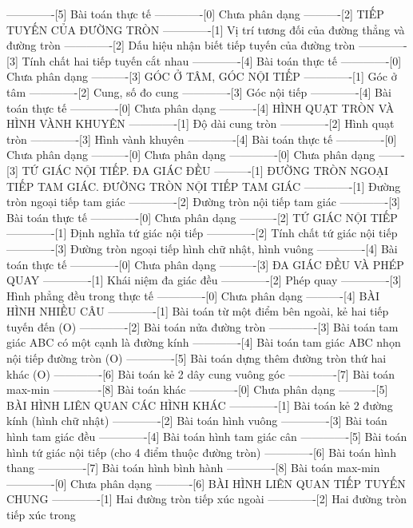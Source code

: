 -------------[5] Bài toán thực tế
-------------[0] Chưa phân dạng
----------[2] TIẾP TUYẾN CỦA ĐƯỜNG TRÒN
-------------[1] Vị trí tương đối của đường thẳng và đường tròn
-------------[2] Dấu hiệu nhận biết tiếp tuyến của đường tròn
-------------[3] Tính chất hai tiếp tuyến cắt nhau
-------------[4] Bài toán thực tế
-------------[0] Chưa phân dạng
----------[3] GÓC Ở TÂM, GÓC NỘI TIẾP
-------------[1] Góc ở tâm
-------------[2] Cung, số đo cung
-------------[3] Góc nội tiếp
-------------[4] Bài toán thực tế
-------------[0] Chưa phân dạng
----------[4] HÌNH QUẠT TRÒN VÀ HÌNH VÀNH KHUYÊN
-------------[1] Độ dài cung tròn
-------------[2] Hình quạt tròn
-------------[3] Hình vành khuyên
-------------[4] Bài toán thực tế
-------------[0] Chưa phân dạng
----------[0] Chưa phân dạng
-------------[0] Chưa phân dạng
-------[3] TỨ GIÁC NỘI TIẾP. ĐA GIÁC ĐỀU
----------[1] ĐƯỜNG TRÒN NGOẠI TIẾP TAM GIÁC. ĐƯỜNG TRÒN NỘI TIẾP TAM GIÁC
-------------[1] Đường tròn ngoại tiếp tam giác
-------------[2] Đường tròn nội tiếp tam giác
-------------[3] Bài toán thực tế
-------------[0] Chưa phân dạng
----------[2] TỨ GIÁC NỘI TIẾP
-------------[1] Định nghĩa tứ giác nội tiếp
-------------[2] Tính chất tứ giác nội tiếp
-------------[3] Đường tròn ngoại tiếp hình chữ nhật, hình vuông
-------------[4] Bài toán thực tế
-------------[0] Chưa phân dạng
----------[3] ĐA GIÁC ĐỀU VÀ PHÉP QUAY
-------------[1] Khái niệm đa giác đều
-------------[2] Phép quay
-------------[3] Hình phẳng đều trong thực tế
-------------[0] Chưa phân dạng
----------[4] BÀI HÌNH NHIỀU CÂU
-------------[1] Bài toán từ một điểm bên ngoài, kẻ hai tiếp tuyến đến (O)
-------------[2] Bài toán nửa đường tròn
-------------[3] Bài toán tam giác ABC có một cạnh là đường kính
-------------[4] Bài toán tam giác ABC nhọn nội tiếp đường tròn (O)
-------------[5] Bài toán dựng thêm đường tròn thứ hai khác (O)
-------------[6] Bài toán kẻ 2 dây cung vuông góc
-------------[7] Bài toán max-min
-------------[8] Bài toán khác
-------------[0] Chưa phân dạng
----------[5] BÀI HÌNH LIÊN QUAN CÁC HÌNH KHÁC
-------------[1] Bài toán kẻ 2 đường kính (hình chữ nhật)
-------------[2] Bài toán hình vuông
-------------[3] Bài toán hình tam giác đều
-------------[4] Bài toán hình tam giác cân
-------------[5] Bài toán hình tứ giác nội tiếp (cho 4 điểm thuộc đường tròn)
-------------[6] Bài toán hình thang
-------------[7] Bài toán hình bình hành
-------------[8] Bài toán max-min
-------------[0] Chưa phân dạng
----------[6] BÀI HÌNH LIÊN QUAN TIẾP TUYẾN CHUNG
-------------[1] Hai đường tròn tiếp xúc ngoài
-------------[2] Hai đường tròn tiếp xúc trong

